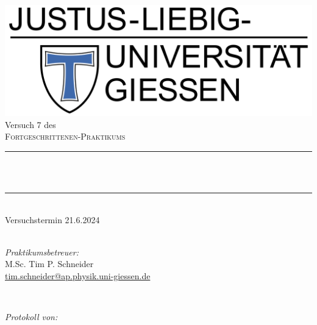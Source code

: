 \documentclass[12pt,a4paper,ngerman]{report}
\title{\versuchstitel}
\author{Frederik Uhlemann, Florian Adamczyk}
\date{\today}
\makeatletter
\let\thetitle\@title
\makeatother
\begin{document}
		
	
	\begin{titlepage}
		\centering
		\vspace*{0.5 cm}
		\includegraphics[width = 0.6 \textwidth]{JLU_Giessen-Logo}	%
		\\[2.0 cm]
		Versuch 7 des\\
		\textsc{\Large Fortgeschrittenen-Praktikums}\\ [0.3 cm]				%
		\rule{\linewidth}{0.2 mm} \\[0.4 cm]
		{ \huge \bfseries \thetitle}\\%
		\rule{\linewidth}{0.2 mm}\\
		Versuchstermin 21.6.2024 \\
		~ \\
		[2.0 cm]
		
		
		\begin{minipage}{0.49\textwidth}
			\begin{flushleft}
				 \emph{Praktikumsbetreuer:}\\
				 M.Sc. Tim P. Schneider\\
				 \small{\href{mailto:tim.schneider@ap.physik.uni-giessen.de}{tim.schneider@ap.physik.uni-giessen.de}}
			\end{flushleft}
		\end{minipage}~
		\begin{minipage}{0.49\textwidth}
			\begin{flushright}
				\emph{Protokoll von:} \\
				

\end{flushright}
\end{minipage}
\end{titlepage}
\end{document}
